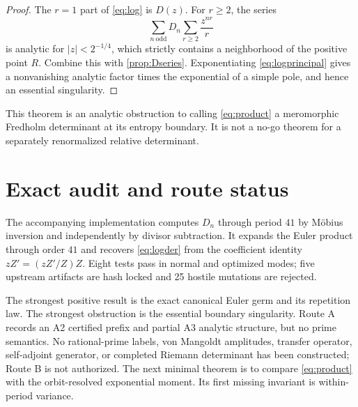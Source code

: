 \documentclass[11pt]{article}
\begin{document}
\begin{proof}
The $r=1$ part of \eqref{eq:log} is $D(z)$.  For $r\ge2$, the series
\[
 \sum_{n\ \mathrm{odd}}D_n\sum_{r\ge2}\frac{z^{nr}}r
\]
is analytic for $|z|<2^{-1/4}$, which strictly contains a neighborhood of
the positive point $R$.  Combine this with \cref{prop:Dseries}.  Exponentiating
\eqref{eq:logprincipal} gives a nonvanishing analytic factor times the
exponential of a simple pole, and hence an essential singularity.
\end{proof}

This theorem is an analytic obstruction to calling \eqref{eq:product} a
meromorphic Fredholm determinant at its entropy boundary.  It is not a no-go
theorem for a separately renormalized relative determinant.

\section{Exact audit and route status}

The accompanying implementation computes $D_n$ through period $41$ by
M\"obius inversion and independently by divisor subtraction.  It expands the
Euler product through order $41$ and recovers \eqref{eq:logder} from the
coefficient identity $zZ'= (zZ'/Z)Z$.  Eight tests pass in normal and
optimized modes; five upstream artifacts are hash locked and 25 hostile
mutations are rejected.

The strongest positive result is the exact canonical Euler germ and its
repetition law.  The strongest obstruction is the essential boundary
singularity.  Route A records an A2 certified prefix and partial A3 analytic
structure, but no prime semantics.  No rational-prime labels, von Mangoldt
amplitudes, transfer operator, self-adjoint generator, or completed Riemann
determinant has been constructed; Route B is not authorized.  The next
minimal theorem is to compare \eqref{eq:product} with the orbit-resolved
exponential moment.  Its first missing invariant is within-period variance.



\end{document}
